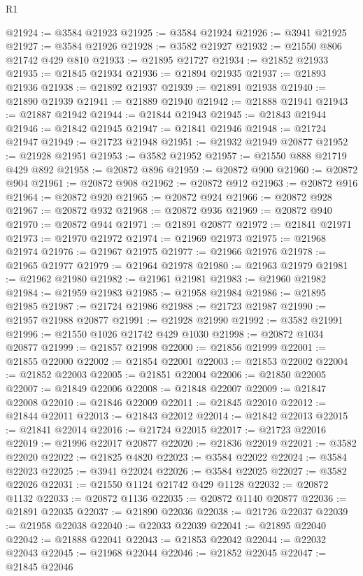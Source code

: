 \begin{lexlean}{R1}
\begin{coremodule}
@21924 := @3584 @21923
@21925 := @3584 @21924
@21926 := @3941 @21925
@21927 := @3584 @21926
@21928 := @3582 @21927
@21932 := @21550 @806 @21742 @429 @810
@21933 := @21895 @21727
@21934 := @21852 @21933
@21935 := @21845 @21934
@21936 := @21894 @21935
@21937 := @21893 @21936
@21938 := @21892 @21937
@21939 := @21891 @21938
@21940 := @21890 @21939
@21941 := @21889 @21940
@21942 := @21888 @21941
@21943 := @21887 @21942
@21944 := @21844 @21943
@21945 := @21843 @21944
@21946 := @21842 @21945
@21947 := @21841 @21946
@21948 := @21724 @21947
@21949 := @21723 @21948
@21951 := @21932 @21949 @20877
@21952 := @21928 @21951
@21953 := @3582 @21952
@21957 := @21550 @888 @21719 @429 @892
@21958 := @20872 @896
@21959 := @20872 @900
@21960 := @20872 @904
@21961 := @20872 @908
@21962 := @20872 @912
@21963 := @20872 @916
@21964 := @20872 @920
@21965 := @20872 @924
@21966 := @20872 @928
@21967 := @20872 @932
@21968 := @20872 @936
@21969 := @20872 @940
@21970 := @20872 @944
@21971 := @21891 @20877
@21972 := @21841 @21971
@21973 := @21970 @21972
@21974 := @21969 @21973
@21975 := @21968 @21974
@21976 := @21967 @21975
@21977 := @21966 @21976
@21978 := @21965 @21977
@21979 := @21964 @21978
@21980 := @21963 @21979
@21981 := @21962 @21980
@21982 := @21961 @21981
@21983 := @21960 @21982
@21984 := @21959 @21983
@21985 := @21958 @21984
@21986 := @21895 @21985
@21987 := @21724 @21986
@21988 := @21723 @21987
@21990 := @21957 @21988 @20877
@21991 := @21928 @21990
@21992 := @3582 @21991
@21996 := @21550 @1026 @21742 @429 @1030
@21998 := @20872 @1034 @20877
@21999 := @21857 @21998
@22000 := @21856 @21999
@22001 := @21855 @22000
@22002 := @21854 @22001
@22003 := @21853 @22002
@22004 := @21852 @22003
@22005 := @21851 @22004
@22006 := @21850 @22005
@22007 := @21849 @22006
@22008 := @21848 @22007
@22009 := @21847 @22008
@22010 := @21846 @22009
@22011 := @21845 @22010
@22012 := @21844 @22011
@22013 := @21843 @22012
@22014 := @21842 @22013
@22015 := @21841 @22014
@22016 := @21724 @22015
@22017 := @21723 @22016
@22019 := @21996 @22017 @20877
@22020 := @21836 @22019
@22021 := @3582 @22020
@22022 := @21825 @4820
@22023 := @3584 @22022
@22024 := @3584 @22023
@22025 := @3941 @22024
@22026 := @3584 @22025
@22027 := @3582 @22026
@22031 := @21550 @1124 @21742 @429 @1128
@22032 := @20872 @1132
@22033 := @20872 @1136
@22035 := @20872 @1140 @20877
@22036 := @21891 @22035
@22037 := @21890 @22036
@22038 := @21726 @22037
@22039 := @21958 @22038
@22040 := @22033 @22039
@22041 := @21895 @22040
@22042 := @21888 @22041
@22043 := @21853 @22042
@22044 := @22032 @22043
@22045 := @21968 @22044
@22046 := @21852 @22045
@22047 := @21845 @22046

\end{coremodule}
\end{lexlean}
